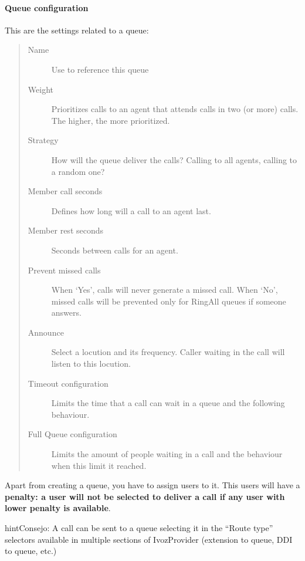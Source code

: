 \documentclass[letterpaper,10pt,spanish]{sphinxmanual}
\begin{document}
\paragraph{Queue configuration}
\label{administration_portal/client/vpbx/routing_endpoints/queues:queue-configuration}
This are the settings related to a queue:
\begin{quote}
\begin{description}
\item[{Name}] \leavevmode
Use to reference this queue

\item[{Weight}] \leavevmode
Prioritizes calls to an agent that attends calls in two (or more) calls. The
higher, the more prioritized.

\item[{Strategy}] \leavevmode
How will the queue deliver the calls? Calling to all agents, calling to a
random one?

\item[{Member call seconds}] \leavevmode
Defines how long will a call to an agent last.

\item[{Member rest seconds}] \leavevmode
Seconds between calls for an agent.

\item[{Prevent missed calls}] \leavevmode
When `Yes', calls will never generate a missed call. When `No', missed calls will be prevented only for RingAll
queues if someone answers.

\item[{Announce}] \leavevmode
Select a locution and its frequency. Caller waiting in the call will listen
to this locution.

\item[{Timeout configuration}] \leavevmode
Limits the time that a call can wait in a queue and the following behaviour.

\item[{Full Queue configuration}] \leavevmode
Limits the amount of people waiting in a call and the behaviour when this limit
it reached.

\end{description}
\end{quote}

Apart from creating a queue, you have to assign users to it. This users will have
a \textbf{penalty: a user will not be selected to deliver a call if any user with lower
penalty is available}.

\begin{notice}{hint}{Consejo:}
A call can be sent to a queue selecting it in the ``Route type'' selectors
available in multiple sections of IvozProvider (extension to queue, DDI
to queue, etc.)
\end{notice}
\end{document}
